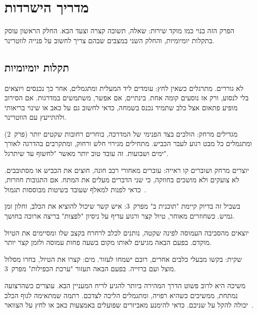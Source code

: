 \chapter{מדריך הישרדות}

הפרק הזה בנוי כמו מוקד שירות: שאלה, תשובה קצרה וצעד הבא. החלק הראשון עוסק בתקלות
יומיומיות, והחלק השני במצבים שבהם צריך לחשוב על פנייה לווטרינר.

\section{תקלות יומיומיות}

לא גוררים. מתרגלים כשאין לחץ: עומדים ליד המעלית ומתגמלים, אחר כך נכנסים ויוצאים בלי לנסוע, ורק
אז נוסעים קומה אחת. בינתיים, אם אפשר, משתמשים במדרגות. אם הסירוב מופיע פתאום אצל כלב שתמיד
נכנס בשמחה, כדאי לחשוב גם על כאב או שינוי בריאותי ולהתייעץ עם הווטרינר.

מגדילים מרחק: הולכים בצד הפנימי של המדרכה, בוחרים רחובות שקטים יותר (פרק~2) ומתגמלים כל מבט
רגוע לעבר הכביש. מתחילים מגירוי חלש ורחוק, ומתקרבים בהדרגה לאורך ימים ושבועות. זה עובד טוב יותר
מאשר "לחשוף עד שיתרגל".

יוצרים מרחק ושוברים קו ראייה: עוברים מאחורי רכב חונה, חוצים את הכביש או מסתובבים. לא צועקים
ולא מושכים בחוזקה, כי שני הדברים מעלים את המתח. אם התגובות חוזרות, כדאי לפנות למאלף שעובד
בשיטות מבוססות תגמול~\cite{avsab2021}.

בשביל זה בדיוק קיימת "תוכנית ב\gr" מפרק~3: איש קשר שיכול להוציא את הכלב, וחלון זמן גמיש. כשחוזרים
מאוחר, טיול קצר ורגוע עדיף על ניסיון "לפצות" בריצה ארוכה בחושך.

יוצאים מהסביבה העמוסה לפינה שקטה, נותנים לכלב לרחרח בקצב שלו ומסיימים את הטיול
מוקדם. בפעם הבאה מגיעים לאותו מקום בשעה פחות עמוסה ולזמן קצר יותר.

שקית: בקשו מבעלי כלבים אחרים, רובם ישמחו לעזור. מים: קצרו את הטיול, בחרו מסלול מוצל ועם
ברזייה. בפעם הבאה תעזור "ערכת הכפילות" מפרק~3.

משיכה היא לרוב פשוט הדרך המהירה ביותר להגיע לריח המעניין הבא. עוצרים כשהרצועה נמתחת, ממשיכים
כשהיא רפויה, ומתגמלים הליכה לצדכם. רתמה שמתאימה לגוף הכלב יכולה להקל על שניכם. כדאי להימנע
מאביזרים שפועלים באמצעות כאב או לחץ על הצוואר~\cite{avsab2021}.

